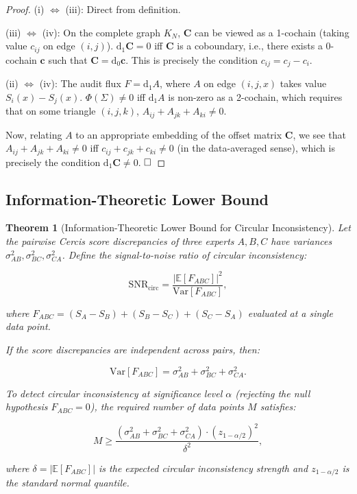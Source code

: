 \documentclass[12pt,a4paper]{article}
\theoremstyle{plain}
\newtheorem{theorem}{Theorem}
\theoremstyle{definition}
\theoremstyle{remark}
\newcommand{\E}{\mathbb{E}}
\newcommand{\Var}{\mathrm{Var}}
\newcommand{\dd}{\mathrm{d}}
\begin{document}
\begin{proof}
(i) $\iff$ (iii): Direct from definition.

(iii) $\iff$ (iv): On the complete graph $K_N$, $\mathbf{C}$ can be viewed as a 1-cochain (taking value $c_{ij}$ on edge $(i,j)$). $\dd_1 \mathbf{C} = 0$ iff $\mathbf{C}$ is a coboundary, i.e., there exists a 0-cochain $\mathbf{c}$ such that $\mathbf{C} = \dd_0 \mathbf{c}$. This is precisely the condition $c_{ij} = c_j - c_i$.

(ii) $\iff$ (iv): The audit flux $F = \dd_1 A$, where $A$ on edge $(i,j,x)$ takes value $S_i(x) - S_j(x)$. $\Phi(\Sigma) \neq 0$ iff $\dd_1 A$ is non-zero as a 2-cochain, which requires that on some triangle $(i,j,k)$, $A_{ij} + A_{jk} + A_{ki} \neq 0$.

Now, relating $A$ to an appropriate embedding of the offset matrix $\mathbf{C}$, we see that $A_{ij} + A_{jk} + A_{ki} \neq 0$ iff $c_{ij} + c_{jk} + c_{ki} \neq 0$ (in the data-averaged sense), which is precisely the condition $\dd_1 \mathbf{C} \neq 0$. $\hfill\square$
\end{proof}

\subsection{Information-Theoretic Lower Bound}
\label{sec:info_bound}

\begin{theorem}[Information-Theoretic Lower Bound for Circular Inconsistency]
\label{thm:info_bound}
Let the pairwise Cercis score discrepancies of three experts $A, B, C$ have variances $\sigma_{AB}^2, \sigma_{BC}^2, \sigma_{CA}^2$. Define the signal-to-noise ratio of circular inconsistency:

\begin{equation}\label{eq:SNR}
    \mathrm{SNR}_{\mathrm{circ}} = \frac{|\E[F_{ABC}]|^2}{\Var[F_{ABC}]},
\end{equation}

where $F_{ABC} = (S_A - S_B) + (S_B - S_C) + (S_C - S_A)$ evaluated at a single data point.

If the score discrepancies are independent across pairs, then:

\begin{equation}\label{eq:SNR_bound}
    \Var[F_{ABC}] = \sigma_{AB}^2 + \sigma_{BC}^2 + \sigma_{CA}^2.
\end{equation}

To detect circular inconsistency at significance level $\alpha$ (rejecting the null hypothesis $F_{ABC} = 0$), the required number of data points $M$ satisfies:

\begin{equation}\label{eq:M_bound}
    M \geq \frac{(\sigma_{AB}^2 + \sigma_{BC}^2 + \sigma_{CA}^2) \cdot (z_{1-\alpha/2})^2}{\delta^2},
\end{equation}

where $\delta = |\E[F_{ABC}]|$ is the expected circular inconsistency strength and $z_{1-\alpha/2}$ is the standard normal quantile.
\end{theorem}
\end{document}
